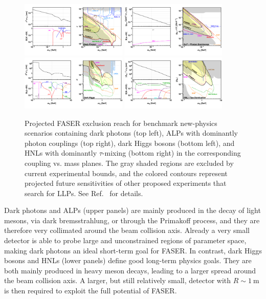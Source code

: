 \begin{figure}[t]
\centering
\includegraphics[trim={17.6cm 0 0 0}, clip, width=0.45\textwidth]{figures/faser/Reach_DarkPhoton.pdf}
\includegraphics[trim={17.6cm 0 0 0}, clip, width=0.45\textwidth]{figures/faser/Reach_ALP.pdf} \hspace{2cm}
\includegraphics[trim={17.6cm 0 0 0}, clip, width=0.45\textwidth]{figures/faser/Reach_DarkHiggs.pdf} 
\includegraphics[trim={17.6cm 0 0 0}, clip, width=0.45\textwidth]{figures/faser/Reach_HNL.pdf}
\caption{
Projected FASER exclusion reach for benchmark new-physics scenarios containing dark photons (top left), ALPs with dominantly photon couplings (top right), dark Higgs bosons (bottom left), and HNLs with dominantly $\tau$-mixing (bottom right) in the corresponding coupling vs. mass planes. The gray shaded regions are excluded by current experimental bounds, and the colored contours represent projected future sensitivities of other proposed experiments that search for LLPs. See Ref.~\cite{Ariga:2018uku} for details. 
}
\label{fig:FaserReach}
\end{figure}

Dark photons and ALPs (upper panels) are mainly produced in the decay of light mesons, via dark bremsstrahlung, or through the Primakoff process, and they are therefore very collimated around the beam collision axis. Already a very small detector is able to probe large and unconstrained regions of parameter space, making dark photons an ideal short-term goal for FASER. In contrast, dark Higgs bosons and HNLs (lower panels) define good long-term physics goals. They are both mainly produced in heavy meson decays, leading to a larger spread around the beam collision axis. A larger, but still relatively small, detector with $R\sim 1~\text{m}$ is then required to exploit the full potential of FASER. 

\newpage
\clearpage


